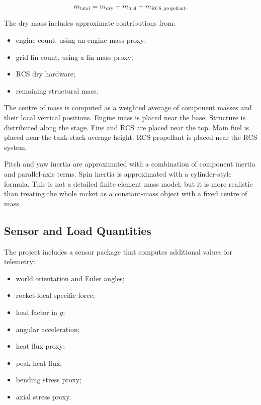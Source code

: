 \documentclass[12pt,a4paper]{article}
\begin{document}
\begin{equation}
m_{\mathrm{total}} =
m_{\mathrm{dry}} + m_{\mathrm{fuel}} + m_{\mathrm{RCS,propellant}}.
\end{equation}

The dry mass includes approximate contributions from:

\begin{itemize}
    \item engine count, using an engine mass proxy;
    \item grid fin count, using a fin mass proxy;
    \item RCS dry hardware;
    \item remaining structural mass.
\end{itemize}

The centre of mass is computed as a weighted average of component masses and their local vertical positions. Engine mass is placed near the base. Structure is distributed along the stage. Fins and RCS are placed near the top. Main fuel is placed near the tank-stack average height. RCS propellant is placed near the RCS system.

Pitch and yaw inertia are approximated with a combination of component inertia and parallel-axis terms. Spin inertia is approximated with a cylinder-style formula. This is not a detailed finite-element mass model, but it is more realistic than treating the whole rocket as a constant-mass object with a fixed centre of mass.

\subsection{Sensor and Load Quantities}

The project includes a sensor package that computes additional values for telemetry:

\begin{itemize}
    \item world orientation and Euler angles;
    \item rocket-local specific force;
    \item load factor in \(g\);
    \item angular acceleration;
    \item heat flux proxy;
    \item peak heat flux;
    \item bending stress proxy;
    \item axial stress proxy.
\end{itemize}
\end{document}
